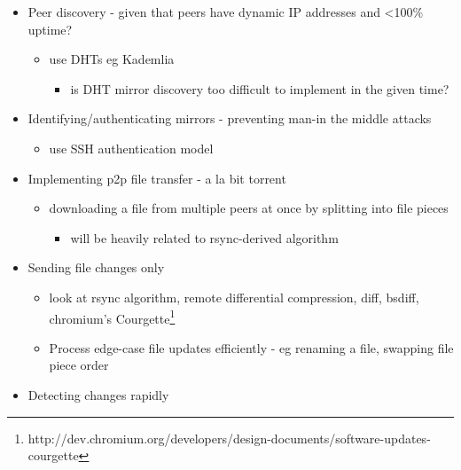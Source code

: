 \documentclass[12pt,a4paper,]{adreport}
\begin{document}
\begin{itemize}
\itemsep1pt\parskip0pt
\item
  Peer discovery - given that peers have dynamic IP addresses and
  \textless{}100\% uptime?

  \begin{itemize}
  \itemsep1pt\parskip0pt
  \item
    use DHTs eg Kademlia

    \begin{itemize}
    \itemsep1pt\parskip0pt
    \item
      is DHT mirror discovery too difficult to implement in the given
      time?
    \end{itemize}
  \end{itemize}
\item
  Identifying/authenticating mirrors - preventing man-in the middle
  attacks

  \begin{itemize}
  \itemsep1pt\parskip0pt
  \item
    use SSH authentication model
  \end{itemize}
\item
  Implementing p2p file transfer - a la bit torrent

  \begin{itemize}
  \itemsep1pt\parskip0pt
  \item
    downloading a file from multiple peers at once by splitting into
    file pieces

    \begin{itemize}
    \itemsep1pt\parskip0pt
    \item
      will be heavily related to rsync-derived algorithm
    \end{itemize}
  \end{itemize}
\item
  Sending file changes only

  \begin{itemize}
  \itemsep1pt\parskip0pt
  \item
    look at rsync algorithm, remote differential compression, diff,
    bsdiff, chromium's Courgette\footnote{http://dev.chromium.org/developers/design-documents/software-updates-courgette}
  \item
    Process edge-case file updates efficiently - eg renaming a file,
    swapping file piece order
  \end{itemize}
\item
  Detecting changes rapidly


\end{itemize}
\end{document}
